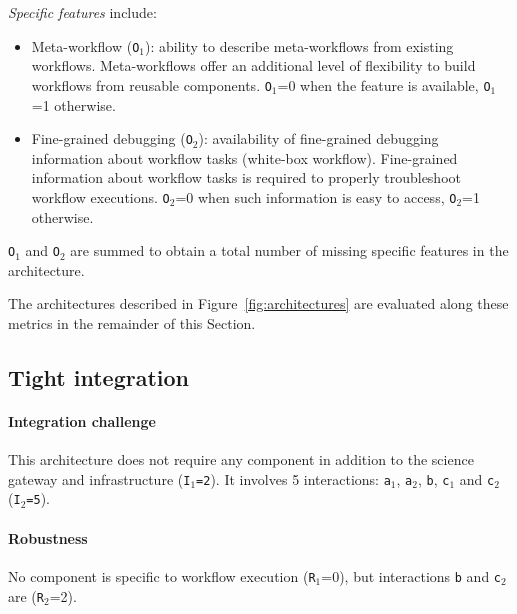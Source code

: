 \documentclass[preprint,3p,twocolumn]{elsarticle}
\begin{document}
\emph{Specific features} include:
\begin{itemize}[leftmargin=0cm,itemindent=0.35cm,itemsep=0cm]
\item Meta-workflow (\texttt{O$_1$}): ability to describe
  meta-workflows from existing workflows. Meta-workflows offer an
  additional level of flexibility to build workflows from reusable
  components. \texttt{O$_1$}=0 when the feature is available,
  \texttt{O$_1$}=1 otherwise.
\item Fine-grained debugging (\texttt{O$_2$}): availability of
  fine-grained debugging information about workflow tasks (white-box
  workflow).  Fine-grained information about workflow tasks is
  required to properly troubleshoot workflow executions.
  \texttt{O$_2$}=0 when such information is easy to access,
  \texttt{O$_2$}=1 otherwise.
\end{itemize}
\texttt{O$_1$} and \texttt{O$_2$} are summed to obtain a total number of missing specific
features in the architecture.


The architectures described in Figure~\ref{fig:architectures} are
evaluated along these metrics in the remainder of this Section.

\subsection{Tight integration}

\paragraph{Integration challenge} This architecture does not require any
component in addition to the science gateway and infrastructure
(\texttt{I$_1$=2}). It involves 5 interactions: \texttt{a$_1$},
\texttt{a$_2$}, \texttt{b}, \texttt{c$_1$} and \texttt{c$_2$}
(\texttt{I$_2$=5}).

\paragraph{Robustness} No component is specific to workflow execution
(\texttt{R$_1$}=0), but interactions \texttt{b} and \texttt{c$_2$} are
(\texttt{R$_2$}=2).
\end{document}
